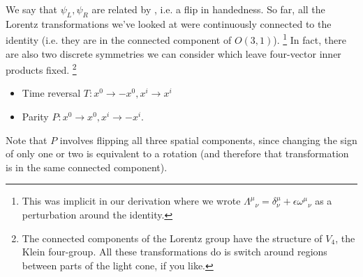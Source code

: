We say that $\psi_L,\psi_R$ are related by , i.e. a flip in handedness. So far, all the Lorentz transformations we've looked at were continuously connected to the identity (i.e. they are in the connected component of $O(3,1)$).%
    \footnote{This was implicit in our derivation where we wrote $\Lambda^\mu{}_\nu=\delta^\mu_\nu + \epsilon \omega^\mu{}_\nu$ as a perturbation around the identity.}
In fact, there are also two discrete symmetries we can consider which leave four-vector inner products fixed.%
    \footnote{The connected components of the Lorentz group have the structure of $V_4$, the Klein four-group. All these transformations do is switch around regions between parts of the light cone, if you like.}
\begin{itemize}
    \item Time reversal $T: x^0\to -x^0, x^i \to x^i$
    \item Parity $P: x^0\to x^0, x^i\to -x^i$.
\end{itemize}
Note that $P$ involves flipping all three spatial components, since changing the sign of only one or two is equivalent to a rotation (and therefore that transformation is in the same connected component).

